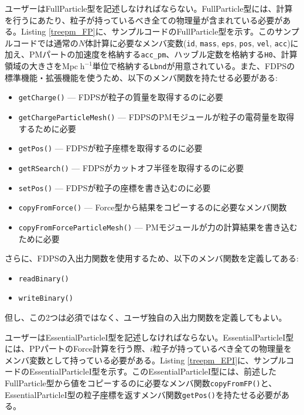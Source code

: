 ユーザーはFullParticle型を記述しなければならない。FullParticle型には、計算を行うにあたり、粒子が持っているべき全ての物理量が含まれている必要がある。Listing \ref{treepm_FP}に、サンプルコードのFullParticle型を示す。このサンプルコードでは通常の$N$体計算に必要なメンバ変数(\texttt{id}, \texttt{mass}, \texttt{eps}, \texttt{pos}, \texttt{vel}, \texttt{acc})に加え、PMパートの加速度を格納する\texttt{acc\_pm}、ハッブル定数を格納する\texttt{H0}、計算領域の大きさを$\mathrm{Mpc\;h^{-1}}$単位で格納する\texttt{Lbnd}が用意されている。また、FDPSの標準機能・拡張機能を使うため、以下のメンバ関数を持たせる必要がある:
\begin{itemize}[leftmargin=*,itemsep=-1ex]
\item \texttt{getCharge()} --- FDPSが粒子の質量を取得するのに必要
\item \texttt{getChargeParticleMesh()} --- FDPSのPMモジュールが粒子の電荷量を取得するために必要
\item \texttt{getPos()} --- FDPSが粒子座標を取得するのに必要
\item \texttt{getRSearch()} --- FDPSがカットオフ半径を取得するのに必要
\item \texttt{setPos()} --- FDPSが粒子の座標を書き込むのに必要
\item \texttt{copyFromForce()} --- Force型から結果をコピーするのに必要なメンバ関数
\item \texttt{copyFromForceParticleMesh()} --- PMモジュールが力の計算結果を書き込むために必要
\end{itemize}
さらに、FDPSの入出力関数を使用するため、以下のメンバ関数を定義してある:
\begin{itemize}[leftmargin=*,itemsep=-1ex]
\item \texttt{readBinary()}
\item \texttt{writeBinary()}
\end{itemize}
但し、この2つは必須ではなく、ユーザ独自の入出力関数を定義してもよい。



ユーザーはEssentialParticleI型を記述しなければならない。EssentialParticleI型には、PPパートのForce計算を行う際、$i$粒子が持っているべき全ての物理量をメンバ変数として持っている必要がある。Listing \ref{treepm_EPI}に、サンプルコードのEssentialParticleI型を示す。このEssentialParticleI型には、前述したFullParticle型から値をコピーするのに必要なメンバ関数\texttt{copyFromFP()}と、EssentialParticleI型の粒子座標を返すメンバ関数\texttt{getPos()}を持たせる必要がある。

